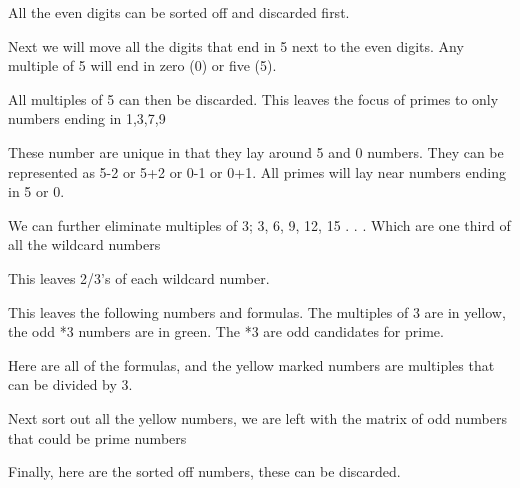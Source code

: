 \documentclass[12pt,letterpaper,oneside,titlepage]{article}
\begin{document}
\par
All the even digits can be sorted off and discarded first.


\par
Next we will move all the digits that end in 5 next to the even digits.  Any
multiple of 5 will end in zero (0) or five (5).


\par
All multiples of 5 can then be discarded.  This leaves the focus of primes
to only numbers ending in 1,3,7,9


\par
These number are unique in that they lay around 5 and 0 numbers.  They can
be represented as 5-2 or 5+2 or 0-1 or 0+1.  All primes will lay near
numbers ending in 5 or 0.



\par
We can further eliminate multiples of 3; 3, 6, 9, 12, 15 . . . Which are one
third of all the wild\textendash card numbers


\par

This leaves 2/3's of each wild\textendash card number.

\par
This leaves the following numbers and formulas.  The multiples of 3 are in
yellow, the odd *3 numbers are in green.  The *3 are odd candidates for
prime.

\par

Here are all of the formulas, and the yellow marked numbers are multiples
that can be divided by 3.

\par

Next sort out all the yellow numbers, we are left with the matrix of odd
numbers that could be prime numbers


\par
Finally, here are the sorted off numbers, these can be discarded.

\pagebreak
\end{document}
